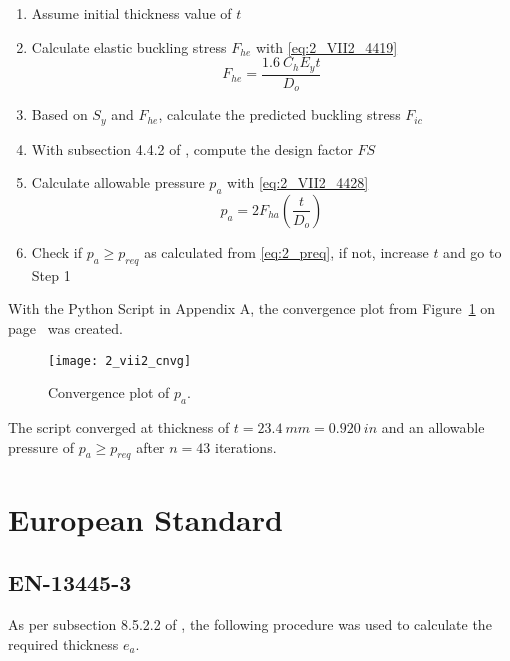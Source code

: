 \begin{enumerate}
	\item Assume initial thickness value of $t$
	\item Calculate elastic buckling stress $F_{he}$ with \ref{eq:2_VII2_4419}
		\begin{equation}
			\label{eq:2_VII2_4419}
			F_{he} = \frac{1.6\ C_h E_y t}{D_o}
		\end{equation}
	\item Based on $S_y$ and $F_{he}$, calculate the predicted buckling stress $F_{ic}$
	\item With subsection 4.4.2 of \citep{ASMEbvpcVII2}, compute the design factor $FS$
	\item Calculate allowable pressure $p_a$ with \ref{eq:2_VII2_4428}
		\begin{equation}
			\label{eq:2_VII2_4428}
			p_a = 2 F_{ha} \left(\frac{t}{D_o}\right)
		\end{equation}
	\item Check if $p_a \geq p_{req}$ as calculated from \ref{eq:2_preq}, if not, increase $t$ and go to Step 1 \\
	
\end{enumerate}

With the Python Script in Appendix A, the convergence plot from Figure~\ref{fig:2_vii2_cnvg} on page~\pageref{fig:2_vii2_cnvg} was created.
\begin{figure}[H]
    \centering
    \texttt{[image: 2\_vii2\_cnvg]}
    \caption{Convergence plot of $p_a$.}
    \label{fig:2_vii2_cnvg}
\end{figure}

The script converged at thickness of $t = 23.4\ mm = 0.920\ in$ and an allowable pressure of $p_a\geq p_{req}$ after $n=43$ iterations. 


\section{European Standard}
\subsection{EN-13445-3}
As per subsection 8.5.2.2 of \citep{EN134453}, the following procedure was used to calculate the required thickness $e_a$.

